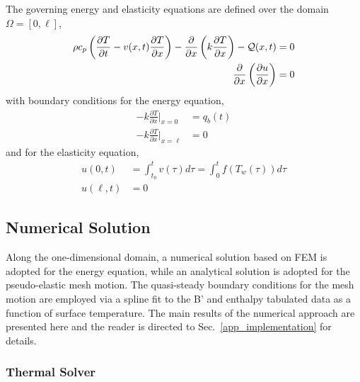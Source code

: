 The governing energy and elasticity equations are defined over the domain $\Omega=[0,\ell]$,
\begin{subequations}
    \begin{align}
        \rho c_p\left(\frac{\partial T}{\partial t} - v(x,t)\frac{\partial T}{\partial x}\right) - \frac{\partial}{\partial x}\left(k\frac{\partial T}{\partial x}\right) - \mathcal{Q}(x,t) &= 0\label{eqn_thermal_1d}\\
        \frac{\partial}{\partial x}\left(\frac{\partial u}{\partial x}\right) &= 0\label{eqn_elasticity_1d}
    \end{align}\label{eqn_rpm}
\end{subequations}
with boundary conditions for the energy equation,
\begin{subequations}
    \begin{align}
        -k\frac{\partial T}{\partial x}\Bigg|_{x=0} &= q_b(t)\\
        -k\frac{\partial T}{\partial x}\Bigg|_{x=\ell} &= 0
    \end{align}
\end{subequations}
and for the elasticity equation,
\begin{subequations}
    \begin{align}
        u(0,t) &= \int_{t_0}^{t}v(\tau)d\tau = \int_{0}^{t} f(T_w(\tau))d\tau\\
        u(\ell,t) &= 0
    \end{align}
\end{subequations}

\subsection{Numerical Solution}

Along the one-dimensional domain, a numerical solution based on FEM is adopted for the energy equation, while an analytical solution is adopted for the pseudo-elastic mesh motion. The quasi-steady boundary conditions for the mesh motion are employed via a spline fit to the B' and enthalpy tabulated data as a function of surface temperature. The main results of the numerical approach are presented here and the reader is directed to Sec.~\ref{app_implementation} for details.

\subsubsection{Thermal Solver}

